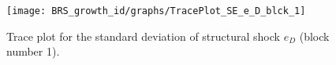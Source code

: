 \begin{figure}[H]
\centering
  \texttt{[image: BRS\_growth\_id/graphs/TracePlot\_SE\_e\_D\_blck\_1]}\\
    \caption{Trace plot for the standard deviation of structural shock ${e_D}$ (block number 1).}
\end{figure}
